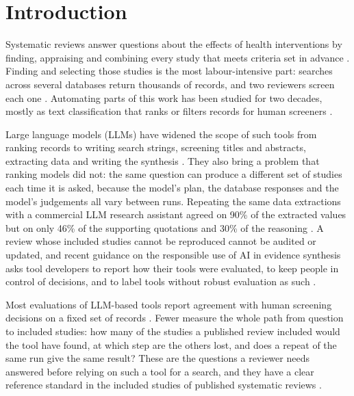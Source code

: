 \section{Introduction}
\label{sec:intro}

Systematic reviews answer questions about the effects of health interventions by finding, appraising and combining
every study that meets criteria set in advance \citep{higgins2023handbook,page2021prisma}. Finding and selecting
those studies is the most labour-intensive part: searches across several databases return thousands of records,
and two reviewers screen each one \citep{borah2017analysis,lefebvre2023searching}. Automating parts of this work
has been studied for two decades, mostly as text classification that ranks or filters records for human screeners
\citep{cohen2006reducing,omara2015using,marshall2019toward,vandeschoot2021open}.

Large language models (LLMs) have widened the scope of such tools from ranking records to writing search strings,
screening titles and abstracts, extracting data and writing the synthesis \citep{wang2023can,guo2024automated,
khraisha2024can,asai2024openscholar}. They also bring a problem that ranking models did not: the same question can
produce a different set of studies each time it is asked, because the model's plan, the database responses and the
model's judgements all vary between runs. Repeating the same data extractions with a commercial LLM research
assistant agreed on 90\% of the extracted values but on only 46\% of the supporting quotations and 30\% of the
reasoning \citep{lagisz2026elicit}. A review whose
included studies cannot be reproduced cannot be audited or updated, and recent guidance on the responsible use of
AI in evidence synthesis asks tool developers to report how their tools were evaluated, to keep people in control
of decisions, and to label tools without robust evaluation as such \citep{raise2026,jointstatement2025}.

Most evaluations of LLM-based tools report agreement with human screening decisions on a fixed set of records
\citep{guo2024automated,khraisha2024can}. Fewer measure the whole path from question to included studies: how many
of the studies a published review included would the tool have found, at which step are the others lost, and does
a repeat of the same run give the same result? These are the questions a reviewer needs answered before relying on
such a tool for a search, and they have a clear reference standard in the included studies of published
systematic reviews \citep{kanoulas2019clef}.

